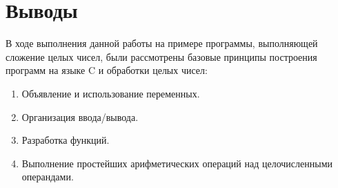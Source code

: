 \section{Выводы}

В ходе выполнения данной работы на примере программы, выполняющей
сложение целых чисел, были рассмотрены базовые принципы
построения программ на языке C и обработки целых чисел:

\begin{enumerate}
  \item Объявление и использование переменных.
  \item Организация ввода/вывода.
  \item Разработка функций.
  \item Выполнение простейших арифметических операций над
    целочисленными операндами.
\end{enumerate}
